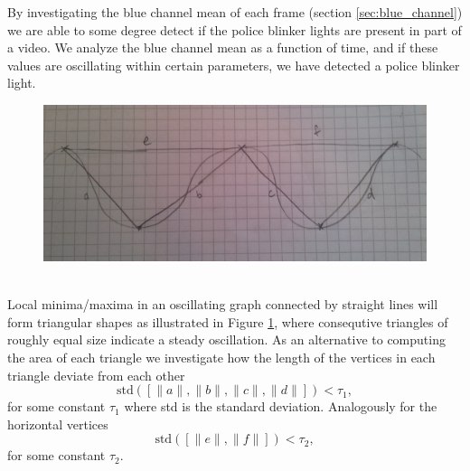By investigating the blue channel mean of each frame (section \ref{sec:blue_channel}) we are able to some degree detect if the police blinker lights are present in part of a video. We analyze the blue channel mean as a function of time, and if these values are oscillating within certain parameters, we have detected a police blinker light.
%
\begin{figure}[h]
     \centering
     \includegraphics[width=1.05\textwidth]{img/triangles.jpg}
     \caption{}\label{fig:triangles}
\end{figure}\\
%
Local minima/maxima in an oscillating graph connected by straight lines will form triangular shapes as illustrated in Figure \ref{fig:triangles}, where consequtive triangles of roughly equal size indicate a steady oscillation. As an alternative to computing the area of each triangle we investigate how the length of the vertices in each triangle deviate from each other
\[
\text{std}([\|a\|,\|b\|,\|c\|,\|d\|]) < \tau_1,
\]
for some constant $\tau_1$ where std is the standard deviation. Analogously for the horizontal vertices
\[
\text{std}([\|e\|,\|f\|]) < \tau_2,
\]
for some constant $\tau_2$.
%
